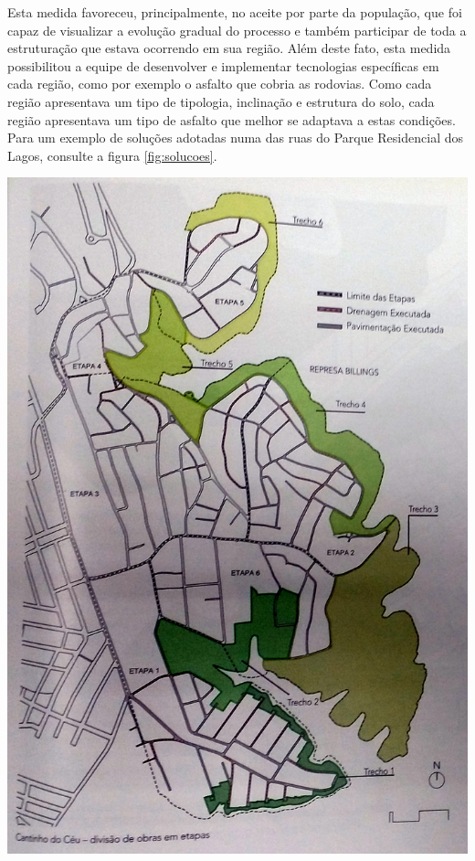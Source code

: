 	Esta medida favoreceu, principalmente, no aceite por parte da população, que foi capaz de visualizar a evolução gradual do processo e também participar de toda a estruturação que estava ocorrendo em sua região. Além deste fato, esta medida possibilitou a equipe de desenvolver e implementar tecnologias específicas em cada região, como por exemplo o asfalto que cobria as rodovias. Como cada região apresentava um tipo de tipologia, inclinação e estrutura do solo, cada região apresentava um tipo de asfalto que melhor se adaptava a estas condições. Para um exemplo de soluções adotadas numa das ruas do Parque Residencial dos Lagos, consulte a figura \ref{fig:solucoes}.

	\noindent
	\begin{minipage}[b]{.53\textwidth}
		\includegraphics[width=\linewidth]{img/barda_etapas}
		\label{fig:barda_etapas}
	\end{minipage}%
